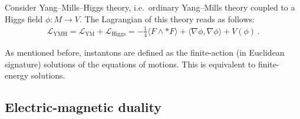     Consider Yang--Mills--Higgs theory, i.e.~ordinary Yang--Mills theory coupled to a Higgs field $\phi:M\rightarrow V$. The Lagrangian of this theory reads as follows:
    \begin{gather}
        \mathcal{L}_{\text{YMH}} = \mathcal{L}_{\text{YM}} + \mathcal{L}_{\text{Higgs}} = -\frac{1}{4}\langle F\wedge\ast F\rangle + \langle\nabla\phi,\nabla\phi\rangle + V(\phi)\,.
    \end{gather}

    As mentioned before, instantons are defined as the finite-action (in Euclidean signature) solutions of the equations of motions. This is equivalent to finite-energy solutions.



\subsection{Electric-magnetic duality}


